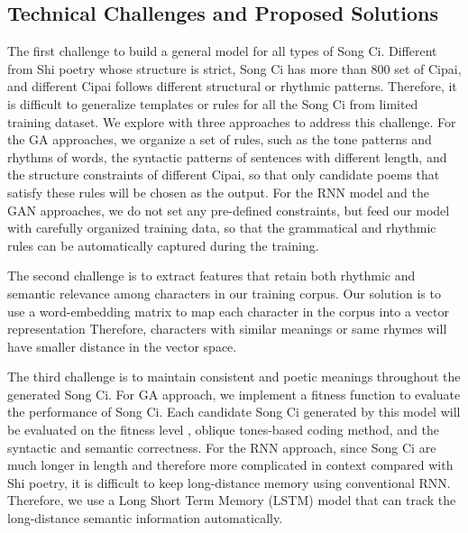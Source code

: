\subsection{Technical Challenges and Proposed Solutions} 
The first challenge to build a general model for all types of Song Ci.
%
Different from Shi poetry whose structure is strict,  Song Ci has more than 800 set of Cipai, and different Cipai follows different structural or rhythmic patterns.
%
Therefore, it is difficult to generalize templates or rules for all the Song Ci from limited training dataset.
%
We explore with three approaches to address this challenge.
%
For the GA approaches, {we organize a set of rules, such as the tone patterns and rhythms of words, the syntactic patterns of sentences with different length, and the structure constraints of different Cipai, so that only candidate poems that satisfy these rules will be chosen as the output.}
% 
For the RNN model and the GAN approaches, we do not set any pre-defined constraints, but feed our model with carefully organized training data, so that the grammatical and rhythmic rules can be automatically captured during the training.

The second challenge is to extract features that retain both rhythmic and semantic relevance among characters in our training corpus. 
%
Our solution is to use a word-embedding matrix to map each character in the corpus into a vector representation
% 
Therefore, characters with similar meanings or same rhymes will have smaller distance in the vector space.


The third challenge is to maintain consistent and poetic meanings throughout the generated Song Ci.
%
{
For GA approach, we implement a fitness function to evaluate the performance of Song Ci. Each candidate Song Ci generated by this model will be evaluated on the fitness level , oblique tones-based coding method, and the syntactic and semantic correctness.}
%
For the RNN approach, since Song Ci are much longer in length and therefore more complicated in context compared with Shi poetry, it is difficult to keep long-distance memory using conventional RNN.
%
Therefore, we use a Long Short Term Memory (LSTM) model that can track the long-distance semantic information automatically.
% 
